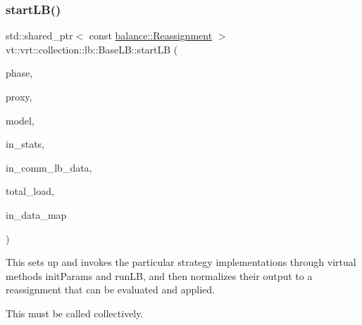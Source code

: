 \subsubsection{\texorpdfstring{start\+L\+B()}{startLB()}}
{\footnotesize\ttfamily std\+::shared\+\_\+ptr$<$ const \hyperlink{structvt_1_1vrt_1_1collection_1_1balance_1_1_reassignment}{balance\+::\+Reassignment} $>$ vt\+::vrt\+::collection\+::lb\+::\+Base\+L\+B\+::start\+LB (\begin{DoxyParamCaption}\item[{\hyperlink{namespacevt_a46ce6733d5cdbd735d561b7b4029f6d7}{Phase\+Type}}]{phase,  }\item[{\hyperlink{structvt_1_1objgroup_1_1proxy_1_1_proxy}{objgroup\+::proxy\+::\+Proxy}$<$ \hyperlink{structvt_1_1vrt_1_1collection_1_1lb_1_1_base_l_b}{Base\+LB} $>$}]{proxy,  }\item[{\hyperlink{structvt_1_1vrt_1_1collection_1_1balance_1_1_load_model}{balance\+::\+Load\+Model} $\ast$}]{model,  }\item[{\hyperlink{structvt_1_1vrt_1_1collection_1_1lb_1_1_base_l_b_acd9bdad961ac83c96b7a227de672f96c}{Statistic\+Map\+Type} const \&}]{in\+\_\+stats,  }\item[{\hyperlink{structvt_1_1vrt_1_1collection_1_1lb_1_1_base_l_b_a83eb4daec14edfb8780422e95b8e38d3}{Element\+Comm\+Type} const \&}]{in\+\_\+comm\+\_\+lb\+\_\+data,  }\item[{\hyperlink{namespacevt_a8fb51741340b87d7aaee0bef60e9896b}{Load\+Type}}]{total\+\_\+load,  }\item[{\hyperlink{namespacevt_1_1vrt_1_1collection_1_1balance_a5794b6bc763c88c78228074bd0d1a50f}{balance\+::\+Data\+Map\+Type} const \&}]{in\+\_\+data\+\_\+map }\end{DoxyParamCaption})}



This sets up and invokes the particular strategy implementations through virtual methods {\ttfamily init\+Params} and {\ttfamily run\+LB}, and then normalizes their output to a reassignment that can be evaluated and applied. 

This must be called collectively.


